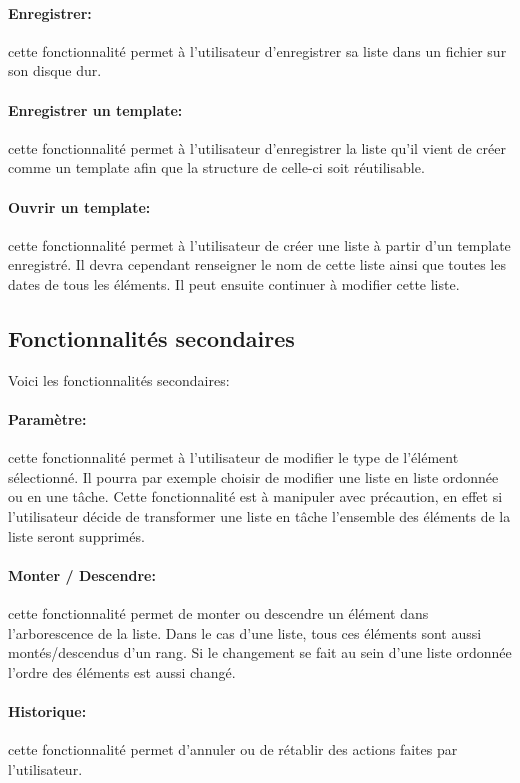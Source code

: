 \documentclass[a4paper,10pt]{article}
\begin{document}
\paragraph{Enregistrer:} cette fonctionnalité permet à l'utilisateur d'enregistrer sa liste dans un fichier sur son disque dur.
\paragraph{Enregistrer un template:} cette fonctionnalité permet à l'utilisateur d'enregistrer la liste qu'il vient de créer comme un template afin que la structure de celle-ci soit réutilisable.
\paragraph{Ouvrir un template:} cette fonctionnalité permet à l'utilisateur de créer une liste à partir d'un template enregistré. Il devra cependant renseigner le nom de cette liste ainsi que toutes les dates de tous les éléments. Il peut ensuite continuer à modifier cette liste.

\subsection{Fonctionnalités secondaires}
Voici les fonctionnalités secondaires:
\paragraph{Paramètre:} cette fonctionnalité permet à l'utilisateur de modifier le type de l'élément sélectionné. Il pourra par exemple choisir de modifier une liste en liste ordonnée ou en une tâche. Cette fonctionnalité est à manipuler avec précaution, en effet si l'utilisateur décide de transformer une liste en tâche l'ensemble des éléments de la liste seront supprimés.
\paragraph{Monter / Descendre:} cette fonctionnalité permet de monter ou descendre un élément dans l'arborescence de la liste. Dans le cas d'une liste, tous ces éléments sont aussi montés/descendus d'un rang. Si le changement se fait au sein d'une liste ordonnée l'ordre des éléments est aussi changé.
\paragraph{Historique:} cette fonctionnalité permet d'annuler ou de rétablir des actions faites par l'utilisateur.
\end{document}
